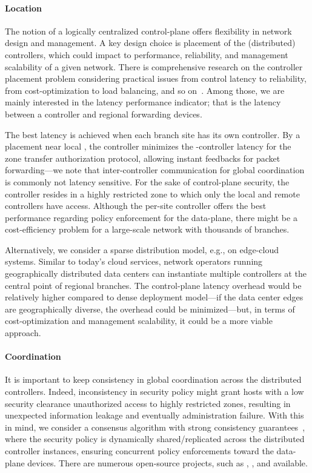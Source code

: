 \paragraph{Location}
The notion of a logically centralized control-plane offers flexibility in network design
and management. A key design choice is placement of the (distributed) controllers, which
could impact to performance, reliability, and management scalability of a given network.
There is comprehensive research on the controller placement problem considering practical
issues from control latency to reliability, from cost-optimization to load balancing, and so
on~\cite{das2019survey,zhang2017role,he2019toward}. Among those, we are mainly interested in the
latency performance indicator; that is the latency between a controller and regional forwarding
devices.

The best latency is achieved when each branch site has its own controller. By a placement
near local \tps, the controller minimizes the \tp-controller latency for the zone
transfer authorization protocol, allowing instant feedbacks for packet forwarding---we note
that inter-controller communication for global coordination is commonly not latency sensitive.
For the sake of control-plane security, the controller resides in a highly restricted zone to
which only the local \tps and remote controllers have access. Although the per-site controller
offers the best performance regarding policy enforcement for the data-plane, there might be a
cost-efficiency problem for a large-scale network with thousands of branches.

Alternatively, we consider a sparse distribution model, e.g., on edge-cloud systems.
Similar to today's cloud services, network operators running geographically distributed
data centers can instantiate multiple controllers at the central point of regional branches.
The control-plane latency overhead would be relatively higher compared to dense deployment
model---if the data center edges are geographically diverse, the overhead could be
minimized---but, in terms of cost-optimization and management scalability, it could
be a more viable approach.

\paragraph{Coordination}
It is important to keep consistency in global coordination across the distributed controllers.
Indeed, inconsistency in security policy might grant hosts with a low security
clearance unauthorized access to highly restricted zones, resulting in unexpected information
leakage and eventually administration failure. With this in mind, we consider a consensus
algorithm with strong consistency guarantees~\cite{panda2013cap,phemius2014disco,shi2014giraffe},
where the security policy is dynamically shared/replicated across the distributed controller
instances, ensuring concurrent policy enforcements toward the data-plane devices. There
are numerous open-source projects, such as ,
, and  available.

